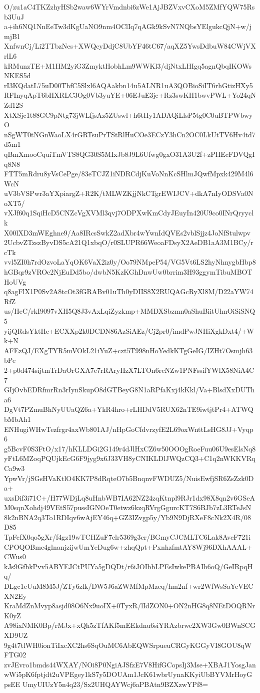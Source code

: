 O/zu1aC4TKZzhyHSb2waw6WYrVmdnbi6zWe1AjJBZVxvCXoM5ZMfYQW75Rsb3UuJ
a+ih6NQ1NnEeTw3dKgUaNO9nm4OClIq7qAGk9kSvN7NQbsYElgukcQjN+w/jmjB1
XnfwnCj/Li2TTbzNes+XWQcyDdjC8UbYF46tC67/aqXZ5YwsDdbuW84CWjVXrlL6
kRMunzTE+M1HM2yiG3ZmyktHobhLm9WWKl3/djNtxLHIgq5agnQbqIKOWsNKES5d
rI3KQdatL75uD00ThfC5Slxl6AQAakbn14u5ALNR1uA3QOBioSiIT6rhGtizHXy5
RFInyqApT6bHXRLC3Og0Vb3yuYE+06EJuE3je+Rz3swKH1bwvPWL+Yo24qNZd12S
XtXSjc1t88GC9pNtg73jWLfjsAz5ZUswl+h6tHy1ADAQiLlsP5tg0C0uBTPWbwyO
nSgWT0tNGnWaoLX4rGRTsuPrTStRlHuCOe3ECzY3hCn2OC0LkUtTV6Hv4td7d5m1
qBmXmooCquiTmVTS8QG30S5MIxJb8J9L6Ufwg0gxO31A3U2f+zPHEcFDVQgIq8N8
FTT5mRdru8yVsCePge/83eTCJZ1iNDRCdjKuVoNnKcSHlmJQwfMpxk429M4l6WcN
uV3bVSPwr3aYXpiargZ+R2K/tMLWZKjjNkCTgrEWIJCV+dkA7nIyODSVa0NoXT5/
vXJf60q1SqiHcD5CNZcVgXVMl3qvj7ODPXwKmCdyJEuyIn420U9co0INrQryyclk
X00lXD3mWEghne9/Aa8IRcsSwkZ2adXbr4wYwnIdQVEs2vblSjjz4JoNfStulwpv
2UcbvZTzszByvDS5cA21Q1xbqO/r0SLUPR66WeoaFDsyX2AeDB1aA3M1BCy/rcTk
vvl5ZI0h7rdOzvoLaYqOK6VaX2iz0y/Oo79NMpeP54/VG5Vt6LS2hyNhnygbHbp8
hGBqr9zVROe2NjEuDd5bo/dwbN5KzKGhDnwUw0brrim3H93ggymTibuMBOTHoUVg
q8agFlX1P0Sv2A8tcOt3fGRABv01uTh0yDIIS8X2RUQAGcRyXl8M/D22aYW74RfZ
us/HeC/rkI9097vXH5Q8J3vAxLqiZyzkmp+MMDXSbzmn0aShuBiitUhnOiSiSNQ5
yijQRdsYktHe+ECXXp2k0DCDN86AzSiAEz/Cj2pr0/imdPwJNHiXgkDxt4/+Wk+N
AFEzQJ/EXgTYR5mVOkL21iYuZ+czt5T998nHoYedkKTgGeIG/IZHt7Osmjh63bPe
2+p0d474sijtmTrDaOrGXA7e7rRAryHzX7LTOn6rcNZw1PNFssifYWlX58NiA4C7
GIjOvbEDRfmrRn3rIynSkupO8dGTBeyG8N1aRPfaKxj4kKkl/Va+BlsdXxDUTha6
DgVt7PZmuBhNyUUaQZ6a+YkR4hro+rLHDdV5RUX62nTE9iwtjtPr4+ATWQbMbAh1
ENHugiWHwTezfrgr4axWb801AJ/nHpGoCfdvrzyfE2L69oxWnttLsHG8JJ+Vyqp6
g5BcvF0S3FtO/x17/hKLLDGi2G149r4dJlHxCZ6w50OOOgRoeFuu06U9esElsNq8
yFtL6MZoqPQUjkEcG6F9jyg9x6J33VH8yCNIKLDlJWQzCQ3+C1q2nWKKVRqCa9w3
YpwVr/jSGsHVaKtlO4KK7P8dRqteO7b5BnqnvFWDUZ5/NuisEwfjSR6ZsZzk0Da+
uxsDif3i71C+/H77WDjLq8uHnbWB7IA62NZ24zqKtnpl9RJr1dx98X8qn2v6GSeA
M0sqnXohdj49VEtS57pussIGNOeT0etwz6kzqRVrgGgurcKT7S6BJb7zL3RTeJsN
8k2nBNA2q3To1RDIqv6wAjEY46q+GZ3IZvgp5y/Yb9N9DjRXeF8cNk2X4R/08D85
TpFcfX0qo5gXr/f4gz19wTCHZuF7clr5369g3cr/BGmyCJCMLTC6Lak8AvcF721i
CPOQOBmc4glnanjzijwUmYeDug6w+zhqQpt+PxnhzfmtAY8Wj96DXhAAAL+CWus0
kJs9GfbkPvv5ABYEJCtPUYa5gDQDt/r6iJOIbbLPEsIwkePBAIh6oQ/GeIRpqHq/
DLgc1eUuM8M5J/ZTy6zlk/DW5J6aZWMfMpMzeq/hm2nf+wr2WfWsSaYcVECXN2Ey
KraMdZnMvyp8asjd08O6Nx9uoIX+0TyxR/lIdZON0+ON2nHG8q8NEtDOQRNrK0yZ
A98ixNMK0Bp/rMJx+xQh5zTfAKf5mEEkdnu6siYRAzbrwc2XW3Gw0BWnSCGXD9UZ
9g4t7tlWH0ionTiIxcXC2hs6SqOuMC6AbEQWSrpueuCRGyKGGyVI8GOU8qWFTG02
zvJEvro1bmds44WXAY/NOi8P0NgiAJSfzE7V8HifGCopsIj3Mse+XBAJ1YosgJan
wWi5pK6fptjdt2uVPEgey1kS7y5DOUAm1JcK61wbrUynaKKyiUbBYVMrHoyGpsEE
UmyUIUzY5n4q23/Sx2UHQAYWcj6aPBAtn9BZXzwYPf8=
